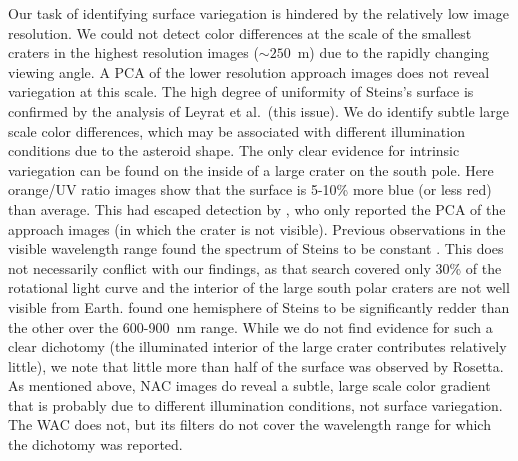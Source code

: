 \documentclass[preprint,3p,authoryear]{elsarticle}
\begin{document}
Our task of identifying surface variegation is hindered by the relatively low image resolution. We could not detect color differences at the scale of the smallest craters in the highest resolution images ($\sim250$~m) due to the rapidly changing viewing angle. A PCA of the lower resolution approach images does not reveal variegation at this scale. The high degree of uniformity of Steins's surface is confirmed by the analysis of Leyrat et al.\ (this issue). We do identify subtle large scale color differences, which may be associated with different illumination conditions due to the asteroid shape. The only clear evidence for intrinsic variegation can be found on the inside of a large crater on the south pole. Here orange/UV ratio images show that the surface is 5-10\% more blue (or less red) than average. This had escaped detection by \citet{K09}, who only reported the PCA of the approach images (in which the crater is not visible). Previous observations in the visible wavelength range found the spectrum of Steins to be constant \citep{D09}. This does not necessarily conflict with our findings, as that search covered only 30\% of the rotational light curve and the interior of the large south polar craters are not well visible from Earth. \citet{W08} found one hemisphere of Steins to be significantly redder than the other over the 600-900~nm range. While we do not find evidence for such a clear dichotomy (the illuminated interior of the large crater contributes relatively little), we note that little more than half of the surface was observed by Rosetta. As mentioned above, NAC images do reveal a subtle, large scale color gradient that is probably due to different illumination conditions, not surface variegation. The WAC does not, but its filters do not cover the wavelength range for which the dichotomy was reported.
\end{document}
